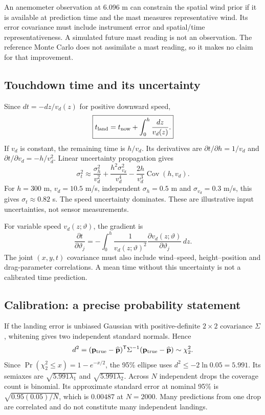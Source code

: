 \documentclass[11pt,a4paper]{article}
\numberwithin{equation}{section}
\begin{document}
An anemometer observation at 6.096 m can constrain the spatial wind prior if it is available at prediction time and the mast measures representative wind. Its error covariance must include instrument error and spatial/time representativeness. A simulated future mast reading is not an observation. The reference Monte Carlo does not assimilate a mast reading, so it makes no claim for that improvement.

\subsection{Touchdown time and its uncertainty}
Since $dt=-dz/v_d(z)$ for positive downward speed,
\begin{equation}
 \boxed{t_{\rm land}=t_{\rm now}+\int_0^h\frac{dz}{v_d(z)}.}
\end{equation}
If $v_d$ is constant, the remaining time is $h/v_d$. Its derivatives are $\partial t/\partial h=1/v_d$ and $\partial t/\partial v_d=-h/v_d^2$. Linear uncertainty propagation gives
\begin{equation}
 \sigma_t^2\approx\frac{\sigma_h^2}{v_d^2}+\frac{h^2\sigma_{v_d}^2}{v_d^4}
 -\frac{2h}{v_d^3}\operatorname{Cov}(h,v_d).
\end{equation}
For $h=300$ m, $v_d=10.5$ m/s, independent $\sigma_h=0.5$ m and $\sigma_{v_d}=0.3$ m/s, this gives $\sigma_t\approx0.82$ s. The speed uncertainty dominates. These are illustrative input uncertainties, not sensor measurements.

For variable speed $v_d(z;\vartheta)$, the gradient is
\begin{equation}
 \frac{\partial t}{\partial\vartheta_j}
 =-\int_0^h\frac{1}{v_d(z;\vartheta)^2}
 \frac{\partial v_d(z;\vartheta)}{\partial\vartheta_j}\,dz.
\end{equation}
The joint $(x,y,t)$ covariance must also include wind--speed, height--position and drag-parameter correlations. A mean time without this uncertainty is not a calibrated time prediction.

\subsection{Calibration: a precise probability statement}
If the landing error is unbiased Gaussian with positive-definite $2\times2$ covariance $\Sigma$, whitening gives two independent standard normals. Hence
\begin{equation}
 d^2=(\mathbf p_{\rm true}-\widehat{\mathbf p})^{\mathsf T}\Sigma^{-1}
 (\mathbf p_{\rm true}-\widehat{\mathbf p})\sim\chi^2_2.
\end{equation}
Since $\Pr(\chi^2_2\leq x)=1-e^{-x/2}$, the 95\% ellipse uses $d^2\leq-2\ln0.05=5.991$. Its semiaxes are $\sqrt{5.991\lambda_1}$ and $\sqrt{5.991\lambda_2}$. Across $N$ independent drops the coverage count is binomial. Its approximate standard error at nominal 95\% is $\sqrt{0.95(0.05)/N}$, which is $0.00487$ at $N=2000$. Many predictions from one drop are correlated and do not constitute many independent landings.
\end{document}
